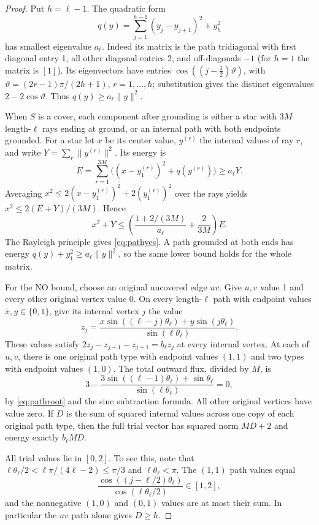 \documentclass[11pt]{article}
\begin{document}
\begin{proof}
Put $h=\ell-1$. The quadratic form
\[
 q(y)=\sum_{j=1}^{h-1}(y_j-y_{j+1})^2+y_h^2
\]
has smallest eigenvalue $a_\ell$. Indeed its matrix is the path
tridiagonal with first diagonal entry 1, all other diagonal entries
2, and off-diagonals $-1$ (for $h=1$ the matrix is $[1]$).
Its eigenvectors have entries $\cos((j-\tfrac12)\vartheta)$,
with $\vartheta=(2r-1)\pi/(2h+1)$, $r=1,\ldots,h$;
substitution gives the distinct eigenvalues $2-2\cos\vartheta$.
Thus $q(y)\geq a_\ell\|y\|^2$.

When $S$ is a cover, each component after grounding is either a
star with $3M$ length-$\ell$ rays ending at ground, or an internal
path with both endpoints grounded. For a star let $x$ be its center
value, $y^{(r)}$ the internal values of ray $r$, and write
$Y=\sum_r\|y^{(r)}\|^2$. Its energy is
\[
 E=\sum_{r=1}^{3M}\bigl((x-y^{(r)}_1)^2+q(y^{(r)})\bigr)
 \geq a_\ell Y.
\]
Averaging $x^2\leq2(x-y^{(r)}_1)^2+2(y^{(r)}_1)^2$ over the
rays yields $x^2\leq2(E+Y)/(3M)$. Hence
\[
 x^2+Y\leq\left(\frac{1+2/(3M)}{a_\ell}+
                    \frac2{3M}\right)E.
\]
The Rayleigh principle gives \eqref{eq:pathyes}. A path grounded
at both ends has energy $q(y)+y_1^2\geq a_\ell\|y\|^2$,
so the same lower bound holds for the whole matrix.

For the NO bound, choose an original uncovered edge $uv$.
Give $u,v$ value 1 and every other original vertex value 0.
On every length-$\ell$ path with endpoint values $x,y\in\{0,1\}$,
give its internal vertex $j$ the value
\begin{equation}\label{eq:pathtrial}
 z_j=\frac{x\sin((\ell-j)\theta_\ell)
               +y\sin(j\theta_\ell)}{\sin(\ell\theta_\ell)}.
\end{equation}
These values satisfy
$2z_j-z_{j-1}-z_{j+1}=b_\ell z_j$ at every internal vertex.
At each of $u,v$, there is one original path type with endpoint
values $(1,1)$ and two types with endpoint values $(1,0)$.
The total outward flux, divided by $M$, is
\[
 3-\frac{3\sin((\ell-1)\theta_\ell)+\sin\theta_\ell}
             {\sin(\ell\theta_\ell)}=0,
\]
by \eqref{eq:pathroot} and the sine subtraction formula.
All other original vertices have value zero. If $D$ is the sum of
squared internal values across one copy of each original path type,
then the full trial vector has squared norm $MD+2$ and energy
exactly $b_\ell MD$.

All trial values lie in $[0,2]$. To see this, note that
$\ell\theta_\ell/2<\ell\pi/(4\ell-2)\leq\pi/3$ and
$\ell\theta_\ell<\pi$. The $(1,1)$ path values equal
\[
 \frac{\cos((j-\ell/2)\theta_\ell)}
      {\cos(\ell\theta_\ell/2)}\in[1,2],
\]
and the nonnegative $(1,0)$ and $(0,1)$ values are at most their
sum. In particular the $uv$ path alone gives $D\geq h$.


\end{proof}
\end{document}
